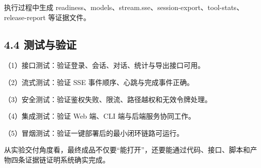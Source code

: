 \documentclass[UTF8]{ctexart}
\begin{document}
执行过程中生成
readiness、models、stream.sse、session-export、tool-stats、release-report
等证据文件。

\subsection{\texorpdfstring{\textbf{4.4
测试与验证}}{4.4 测试与验证}}\label{ux6d4bux8bd5ux4e0eux9a8cux8bc1}

（1）接口测试：验证登录、会话、对话、统计与导出接口可用。

（2）流式测试：验证 SSE 事件顺序、心跳与完成事件正确。

（3）安全测试：验证鉴权失败、限流、路径越权和无效令牌处理。

（4）集成测试：验证 Web 端、CLI 端与后端服务协同工作。

（5）冒烟测试：验证一键部署后的最小闭环链路可运行。

从实验交付角度看，最终成品不仅要``能打开''，还要能通过代码、接口、脚本和产物四条证据链证明系统确实完成。
\end{document}
